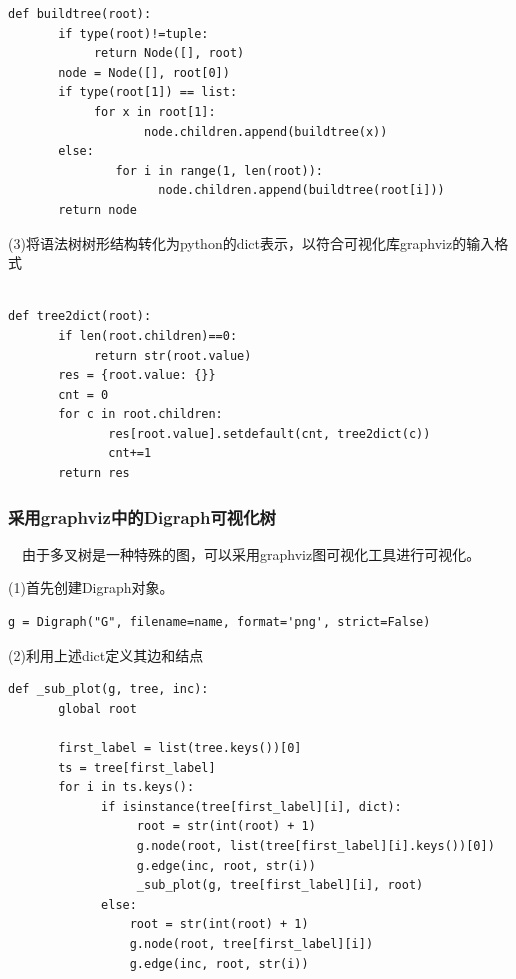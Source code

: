 \documentclass{article}
\begin{document}
\begin{verbatim}
def buildtree(root):
       if type(root)!=tuple:
            return Node([], root)
       node = Node([], root[0])
       if type(root[1]) == list:
            for x in root[1]:
                   node.children.append(buildtree(x))
       else:
               for i in range(1, len(root)):
                     node.children.append(buildtree(root[i]))
       return node
\end{verbatim}

(3)将语法树树形结构转化为python的dict表示，以符合可视化库graphviz的输入格式

\begin{verbatim}

def tree2dict(root):
       if len(root.children)==0:
            return str(root.value)
       res = {root.value: {}}
       cnt = 0
       for c in root.children:
              res[root.value].setdefault(cnt, tree2dict(c))
              cnt+=1
       return res
\end{verbatim}

\subsubsection{采用graphviz中的Digraph可视化树}

\quad\ \ 由于多叉树是一种特殊的图，可以采用graphviz图可视化工具进行可视化。

(1)首先创建Digraph对象。

\begin{verbatim}
g = Digraph("G", filename=name, format='png', strict=False)
\end{verbatim}

(2)利用上述dict定义其边和结点

\begin{verbatim}
def _sub_plot(g, tree, inc):
       global root

       first_label = list(tree.keys())[0]
       ts = tree[first_label]
       for i in ts.keys():
             if isinstance(tree[first_label][i], dict):
                  root = str(int(root) + 1)
                  g.node(root, list(tree[first_label][i].keys())[0])
                  g.edge(inc, root, str(i))
                  _sub_plot(g, tree[first_label][i], root)
             else:
                 root = str(int(root) + 1)
                 g.node(root, tree[first_label][i])
                 g.edge(inc, root, str(i))
\end{verbatim}
\end{document}
